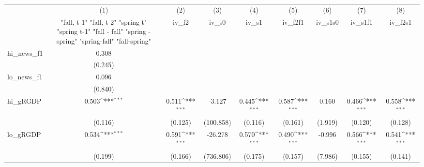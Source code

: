 {
\def\sym#1{\ifmmode^{#1}\else\(^{#1}\)\fi}
\begin{tabular}{l*{8}{c}}
\toprule
            &\multicolumn{1}{c}{(1)}&\multicolumn{1}{c}{(2)}&\multicolumn{1}{c}{(3)}&\multicolumn{1}{c}{(4)}&\multicolumn{1}{c}{(5)}&\multicolumn{1}{c}{(6)}&\multicolumn{1}{c}{(7)}&\multicolumn{1}{c}{(8)}\\
            &\multicolumn{1}{c}{  "fall, t-1" "fall, t-2" "spring t" "spring t-1"  "fall - fall" "spring - spring" "spring-fall" "fall-spring" }&\multicolumn{1}{c}{iv\_f2}&\multicolumn{1}{c}{iv\_s0}&\multicolumn{1}{c}{iv\_s1}&\multicolumn{1}{c}{iv\_f2f1}&\multicolumn{1}{c}{iv\_s1s0}&\multicolumn{1}{c}{iv\_s1f1}&\multicolumn{1}{c}{iv\_f2s1}\\
\midrule
hi\_news\_f1  &       0.308         &                     &                     &                     &                     &                     &                     &                     \\
            &     (0.245)         &                     &                     &                     &                     &                     &                     &                     \\
\addlinespace
lo\_news\_f1  &       0.096         &                     &                     &                     &                     &                     &                     &                     \\
            &     (0.840)         &                     &                     &                     &                     &                     &                     &                     \\
\addlinespace
hi\_gRGDP    &       0.503\sym{***}&       0.511\sym{***}&      -3.127         &       0.445\sym{***}&       0.587\sym{***}&       0.160         &       0.466\sym{***}&       0.558\sym{***}\\
            &     (0.116)         &     (0.125)         &   (100.858)         &     (0.116)         &     (0.161)         &     (1.919)         &     (0.120)         &     (0.128)         \\
\addlinespace
lo\_gRGDP    &       0.534\sym{***}&       0.591\sym{***}&     -26.278         &       0.570\sym{***}&       0.490\sym{***}&      -0.996         &       0.566\sym{***}&       0.541\sym{***}\\
            &     (0.199)         &     (0.166)         &   (736.806)         &     (0.175)         &     (0.157)         &     (7.986)         &     (0.155)         &     (0.141)         \\

\end{tabular}}
